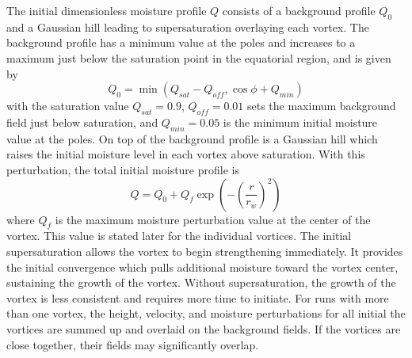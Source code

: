   The initial dimensionless moisture profile $Q$ consists of a background profile $Q_0$ and a 
  Gaussian hill leading to supersaturation overlaying each vortex. 
  The background profile has a minimum value at the poles and increases to a 
  maximum just below the saturation point in the equatorial region, and is given by
   \begin{equation}
    \label{eq:q0} Q_0 = \min(Q_{sat} - Q_{off}, \cos\phi + Q_{min})
  \end{equation}
  with the saturation value $Q_{sat}=0.9$, $Q_{off}= 0.01$ sets the maximum 
  background field just below saturation, and $Q_{min} = 0.05$ is the minimum initial moisture
  value at the poles. On top of the background profile is a Gaussian hill which raises the initial moisture
  level in each vortex above saturation. With this perturbation,
   the total initial moisture profile is
   \begin{equation}
    \label{eq:q} Q = Q_0 + Q_{f}\exp{\left(-\left(\frac{r}
    {r_w}\right)^2\right)}
   \end{equation} 
   where $Q_f$ is the maximum moisture perturbation value at the center of the vortex.
   This value is stated later for the individual vortices.
   The initial supersaturation allows the vortex to begin strengthening immediately. It 
   provides the initial convergence which pulls additional moisture toward the vortex center, sustaining 
   the growth of the vortex.  Without supersaturation, the growth of the vortex is less consistent
   and requires more time to initiate. For runs with more than one vortex, 
   the height, velocity, and moisture perturbations for all initial the vortices are summed up 
   and overlaid on the background fields. If the vortices are close together, 
   their fields may significantly overlap.
     
